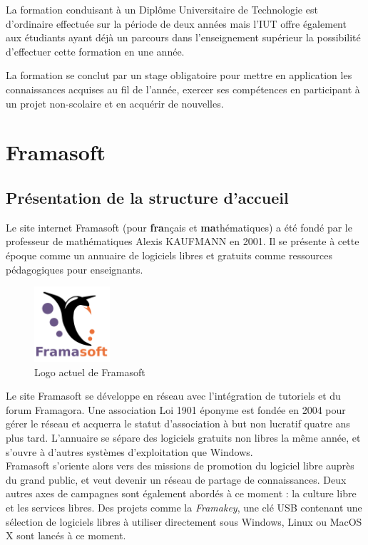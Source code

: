 \documentclass[10pt,a4paper]{report}
\begin{document}
	La formation conduisant à un Diplôme Universitaire de Technologie est d'ordinaire effectuée sur la période de deux années mais l'IUT offre également aux étudiants ayant déjà un parcours dans l'enseignement supérieur la possibilité d'effectuer cette formation en une année.
	
	La formation se conclut par un stage obligatoire pour mettre en application les connaissances acquises au fil de l'année, exercer ses compétences en participant à un projet non-scolaire et en acquérir de nouvelles.
	
	\section{Framasoft}
	\subsection{Présentation de la structure d'accueil}
	
	Le site internet Framasoft (pour \textbf{fra}nçais et \textbf{ma}thématiques) a été fondé par le professeur de mathématiques Alexis KAUFMANN en 2001. Il se présente à cette époque comme un annuaire de logiciels libres et gratuits comme ressources pédagogiques pour enseignants.
	
	\begin{figure}[ht]
		\centering
		\includegraphics[width=0.25\textwidth]{images/Framasoft-Logo.png}
		\caption*{Logo actuel de Framasoft}
		\label{normal_case}
	\end{figure}
	
	Le site Framasoft se développe en réseau avec l'intégration de tutoriels et du forum Framagora. Une association Loi 1901 éponyme est fondée en 2004 pour gérer le réseau et acquerra le statut d'association à but non lucratif quatre ans plus tard. L'annuaire se sépare des logiciels gratuits non libres la même année, et s'ouvre à d'autres systèmes d'exploitation que Windows.
	\\
	
	Framasoft s'oriente alors vers des missions de promotion du logiciel libre auprès du grand public, et veut devenir un réseau de partage de connaissances. Deux autres axes de campagnes sont également abordés à ce moment : la culture libre et les services libres. Des projets comme la \textit{Framakey}, une clé USB contenant une sélection de logiciels libres à utiliser directement sous Windows, Linux ou MacOS X sont lancés à ce moment.
	\\
	
\end{document}
